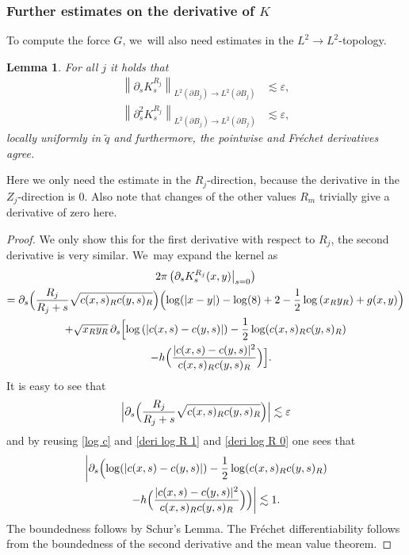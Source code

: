 \documentclass[10pt]{amsart}
\let\epsilon\varepsilon
\newtheorem{lemma}[theorem]{Lemma}
\theoremstyle{definition}
\newcommand\norm[1]{\left\lVert #1\right\rVert}
\newcommand\eq{=}
\let\de\partial
\let\eps\epsilon
\begin{document}
\subsubsection{Further estimates on the derivative of $K$}
To compute the force $G$, we~will also need estimates in the $L^2\to L^2$-topology.

\begin{lemma}\label{deri K L2}
For all $j$ it holds that
\begin{align*}
\norm{\de_s K_s^{R_j}}_{L^2(\de B_j)\to L^2(\de B_j)}&\lesssim \eps,
\\
\tag*{and}
\norm{\de_s^2 K_s^{R_j}}_{L^2(\de B_j)\to L^2(\de B_j)}&\lesssim \eps,
\end{align*}
locally uniformly in $\tilde{q}$ and furthermore, the pointwise and Fréchet derivatives agree.
\end{lemma}

Here we only need the estimate in the $R_j$-direction, because the derivative in the $Z_j$-direction is $0$. Also note that changes of the other values $R_m$ trivially give a derivative of zero here.

\pagebreak[2]
\begin{proof}
We only show this for the first derivative with respect to $R_j$, the second derivative is very similar. We~may expand the kernel as
\begin{multline*}
2\pi\left(\de_sK_s^{R_j}(x,y)\big|_{s=0}\right)\\
\eq \de_s\Bigl(\frac{R_j}{R_j+s}\sqrt{c(x,s)_Rc(y,s)_R}\Bigr)\Bigl(\log(|x-y|)-\log(8)+2-\frac{1}{2}\log\left(x_Ry_R\right)+g(x,y)\Bigr)\\
+\sqrt{x_Ry_R}\,\de_s\Bigl[\log\left(|c(x,s)-c(y,s)|\right)-\frac{1}{2}\log(c(x,s)_Rc(y,s)_R)\\
\quad-h\Bigl(\frac{|c(x,s)-c(y,s)|^2}{c(x,s)_Rc(y,s)_R}\Bigr)\Bigr].
\end{multline*}
It is easy to see that
\begin{align*}
\Bigl|\de_s\Bigl(\frac{R_j}{R_j+s}\sqrt{c(x,s)_Rc(y,s)_R}\Bigr)\Bigr|\lesssim \eps
\end{align*}
and by reusing \eqref{log c} and \eqref{deri log R 1} and \eqref{deri log R 0} one sees that
\begin{multline}\label{bd sqrt}
\biggl|\de_s\Bigl(\log(|c(x,s)-c(y,s)|)-\frac{1}{2}\log(c(x,s)_Rc(y,s)_R)\\
-h\Bigl(\frac{|c(x,s)-c(y,s)|^2}{c(x,s)_Rc(y,s)_R}\Bigr)\Bigr)\biggr|\lesssim 1.
\end{multline}
The boundedness follows by Schur's Lemma. The Fréchet differentiability follows from the boundedness of the second derivative and the mean value theorem.
\end{proof}
\end{document}
